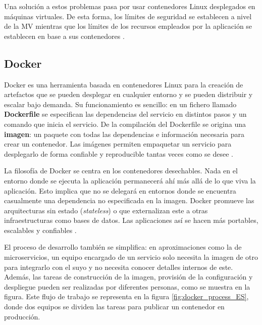 \documentclass[11pt,spanish,listoffigures]{tfgetsinf}
\begin{document}
Una solución a estos problemas pasa por usar contenedores Linux desplegados en máquinas virtuales. De esta forma, los límites de seguridad se establecen a nivel de la MV mientras que los límites de los recursos empleados por la aplicación se establecen en base a sus contenedores \cite{DeAlfonso2017}.

\subsection{Docker}

Docker \cite{Matthias} es una herramienta basada en contenedores Linux para la creación de artefactos que se pueden desplegar en cualquier entorno y se pueden distribuir y escalar bajo demanda. Su funcionamiento es sencillo: en un fichero llamado \textbf{Dockerfile} se especifican las dependencias del servicio en distintos pasos y un comando que inicia el servicio. De la compilación del Dockerfile se origina una \textbf{imagen}: un paquete con todas las dependencias e información necesaria para crear un contenedor. Las imágenes permiten empaquetar un servicio para desplegarlo de forma confiable y reproducible tantas veces como se desee \cite{DelaTorre2018}.

La filosofía de Docker se centra en los contenedores desechables. Nada en el entorno donde se ejecuta la aplicación permanecerá ahí más allá de lo que viva la aplicación. Esto implica que no se delegará en entornos donde se encuentra casualmente una dependencia no especificada en la imagen. Docker promueve las arquitecturas sin estado (\textit{stateless}) o que externalizan este a otras infraestructuras como bases de datos. Las aplicaciones así se hacen más portables, escalables y confiables \cite{Matthias}.

El proceso de desarrollo también se simplifica: en aproximaciones como la de microservicios, un equipo encargado de un servicio solo necesita la imagen de otro para integrarlo con el suyo y no necesita conocer detalles internos de este. Además, las tareas de construcción de la imagen, provisión de la configuración y despliegue pueden ser realizadas por diferentes personas, como se muestra en la figura. Este flujo de trabajo se representa en la figura \ref{fig:docker_process_ES}, donde dos equipos se dividen las tareas para publicar un contenedor en producción. 
\end{document}
